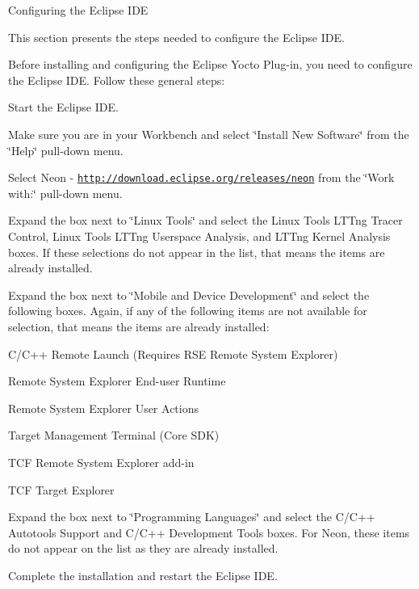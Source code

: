 \begin{DoxyItemize}
\begin{DoxyItemize}
\end{DoxyItemize}
\item Configuring the Eclipse I\+DE
\begin{DoxyItemize}
\item This section presents the steps needed to configure the Eclipse I\+DE.
\item Before installing and configuring the Eclipse Yocto Plug-\/in, you need to configure the Eclipse I\+DE. Follow these general steps\+:
\begin{DoxyItemize}
\item Start the Eclipse I\+DE.
\item Make sure you are in your Workbench and select \char`\"{}\+Install New Software\char`\"{} from the \char`\"{}\+Help\char`\"{} pull-\/down menu.
\item Select Neon -\/ \href{http://download.eclipse.org/releases/neon}{\tt http\+://download.\+eclipse.\+org/releases/neon} from the \char`\"{}\+Work with\+:\char`\"{} pull-\/down menu.
\item Expand the box next to \char`\"{}\+Linux Tools\char`\"{} and select the Linux Tools L\+T\+Tng Tracer Control, Linux Tools L\+T\+Tng Userspace Analysis, and L\+T\+Tng Kernel Analysis boxes. If these selections do not appear in the list, that means the items are already installed.
\item Expand the box next to \char`\"{}\+Mobile and Device Development\char`\"{} and select the following boxes. Again, if any of the following items are not available for selection, that means the items are already installed\+:
\begin{DoxyItemize}
\item C/\+C++ Remote Launch (Requires R\+SE Remote System Explorer)
\item Remote System Explorer End-\/user Runtime
\item Remote System Explorer User Actions
\item Target Management Terminal (Core S\+DK)
\item T\+CF Remote System Explorer add-\/in
\item T\+CF Target Explorer
\end{DoxyItemize}
\item Expand the box next to \char`\"{}\+Programming Languages\char`\"{} and select the C/\+C++ Autotools Support and C/\+C++ Development Tools boxes. For Neon, these items do not appear on the list as they are already installed.
\item Complete the installation and restart the Eclipse I\+DE. ~\newline

\end{DoxyItemize}
\end{DoxyItemize}
\end{DoxyItemize}
